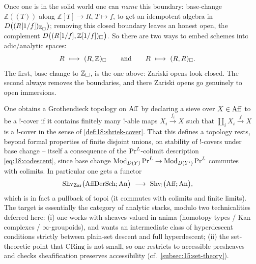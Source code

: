 \begin{remark}
\begin{center}
\end{center}
Once one is in the solid world one can \emph{name} this boundary: base-change
$\mathbb{Z}(\!(T)\!)$ along $\mathbb{Z}[T]\to R$, $T\mapsto f$, to get an idempotent
algebra in $D\bigl((R[1/f])_{\mathbb{Z}_\square}\bigr)$; removing this closed
boundary leaves an honest open, the complement
$D\bigl((R[1/f],\mathbb{Z}[1/f])_\square\bigr)$. So there are two ways to embed
schemes into adic/analytic spaces:
\begin{equation*}
R\ \longmapsto\ (R,\mathbb{Z})_\solid\qquad\text{and}\qquad R\ \longmapsto\ (R,R)_\solid.
\end{equation*}
The first, base change to $\mathbb{Z}_\square$, is the one above: Zariski opens look
closed. The second always removes the boundaries, and there Zariski opens go
genuinely to open immersions.
\end{remark}

\begin{remark}
\label{rmk:18:topology-topoi}
One obtains a Grothendieck topology on $\operatorname{Aff}$ by declaring a sieve over $X\in\operatorname{Aff}$
to be a $!$-cover if it contains finitely many $!$-able maps $X_i\xrightarrow{f_i}X$
such that $\coprod_i X_i\xrightarrow{f}X$ is a $!$-cover in the sense of
\cref{def:18:shriek-cover}. That this defines a topology rests, beyond formal
properties of finite disjoint unions, on stability of $!$-covers under base change
-- itself a consequence of the $\mathrm{Pr}^{L}$-colimit description \eqref{eq:18:codescent},
since base change $\operatorname{Mod}_{D(Y)}\mathrm{Pr}^{L}\to\operatorname{Mod}_{D(Y')}\mathrm{Pr}^{L}$ commutes with colimits. In
particular one gets a functor
\begin{equation*}
\mathrm{Shv}_{\mathrm{Zar}}\bigl(\mathrm{AffDerSch};\mathrm{An}\bigr)\ \longrightarrow\ \mathrm{Shv}_{!}\bigl(\Aff;\mathrm{An}\bigr),
\end{equation*}
which is in fact a pullback of topoi (it commutes with colimits and finite
limits). The target is essentially the category of analytic stacks, modulo two
technicalities deferred here: (i) one works with sheaves valued in anima
(homotopy types / Kan complexes / $\infty$-groupoids), and wants an intermediate
class of hyperdescent conditions strictly between plain-set descent and full
hyperdescent; (ii) the set-theoretic point that $\mathrm{CRing}$ is not small, so
one restricts to accessible presheaves and checks sheafification preserves
accessibility (cf.\ \cref{subsec:15:set-theory}).
\end{remark}

